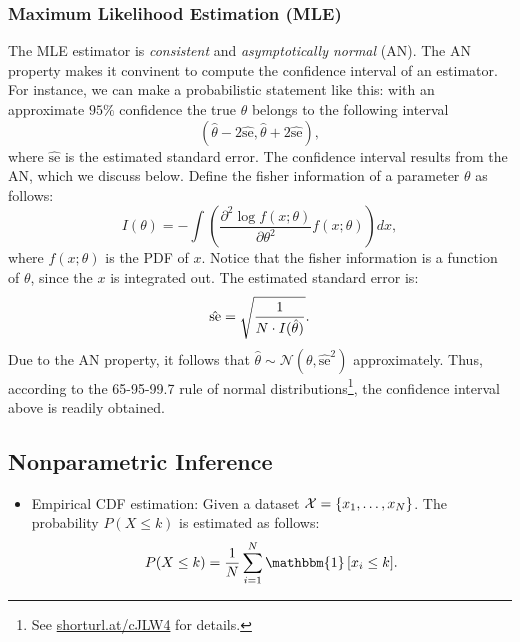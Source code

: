 \subsubsection{Maximum Likelihood Estimation (MLE)}
    The MLE estimator is \emph{consistent} and \emph{asymptotically normal} (AN).
    The AN property makes it convinent to compute the confidence interval of an estimator. For instance, we can make a probabilistic statement like this: with an approximate $95\%$ confidence  the true $\theta$ belongs to the following interval
        \begin{equation}
            \left( \hat{\theta} - 2\hat{\text{se}},  \hat{\theta} + 2\hat{\text{se}} \right),
        \end{equation}
    where $\hat{\text{se}}$ is the estimated standard error.
    The confidence interval results from the AN, which we  discuss below.
    Define the fisher information of a parameter $\theta$ as follows:
        \begin{equation}
            I(\theta) = -\int \left( \frac{\partial^2 \log f(x; \theta)}{\partial \theta^2} f(x; \theta) \right) d x,
        \end{equation}
    where $f(x; \theta)$ is the PDF of $x$.
    Notice that the fisher information is a function of $\theta$, since the $x$ is integrated out. 
    The estimated standard error is:
        \begin{equation}
            \hat{\text{se}} = \sqrt{\frac{1}{N \cdot I(\hat{\theta})}}.
        \end{equation}
    Due to the AN property, it follows that $\hat{\theta} \sim \mathcal{N}(\theta, \hat{\text{se}}^2 )$ approximately.
    Thus, according to the 65-95-99.7 rule of normal distributions\footnote{See \url{shorturl.at/cJLW4} for details.}, the confidence interval above is readily obtained. 
    

\subsection{Nonparametric Inference}
    \begin{itemize}
        \item Empirical CDF estimation: Given a dataset $\mathcal{X}=\{ x_1, \ldots, x_N \}$.
        The probability $P(X \le k)$ is estimated as follows:
            \begin{equation}
                P(X \le k) = \frac{1}{\ndata}\sum_{i=1}^{\ndata}{\mathbbm{1}
                    \left[ x_i \le k \right]
                }.
            \end{equation}
    \end{itemize}
    
